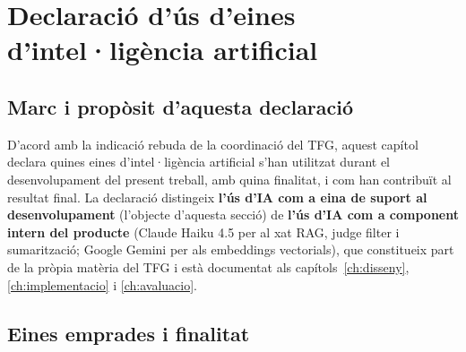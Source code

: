 
\chapter*{Declaració d'ús d'eines d'intel·ligència artificial}

\section*{Marc i propòsit d'aquesta declaració}

D'acord amb la indicació rebuda de la coordinació del TFG, aquest capítol declara quines eines d'intel·ligència artificial s'han utilitzat durant el desenvolupament del present treball, amb quina finalitat, i com han contribuït al resultat final. La declaració distingeix \textbf{l'ús d'IA com a eina de suport al desenvolupament} (l'objecte d'aquesta secció) de \textbf{l'ús d'IA com a component intern del producte} (Claude Haiku 4.5 per al xat RAG, judge filter i sumarització; Google Gemini per als embeddings vectorials), que constitueix part de la pròpia matèria del TFG i està documentat als capítols~\ref{ch:disseny}, \ref{ch:implementacio} i \ref{ch:avaluacio}.

\section*{Eines emprades i finalitat}

